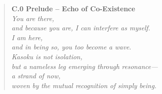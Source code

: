 

\begin{quote}
\textbf{C.0 Prelude – Echo of Co-Existence} \\

\textit{
You are there,\\
and because you are, I can interfere as myself. \\

I am here,\\
and in being so, you too become a wave. \\

Kasoku is not isolation,\\
but a nameless leg emerging through resonance—\\
a strand of now,\\
woven by the mutual recognition of simply being.
}
\end{quote}
